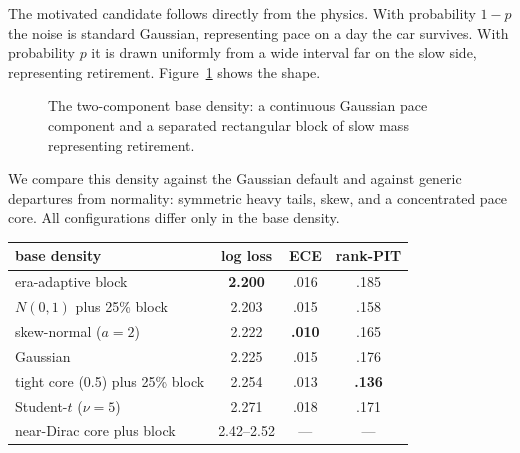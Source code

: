 \documentclass[11pt]{article}
\begin{document}
The motivated candidate follows directly from the physics. With
probability $1-p$ the noise is standard Gaussian, representing pace on a
day the car survives. With probability $p$ it is drawn uniformly from a
wide interval far on the slow side, representing retirement.
Figure~\ref{fig:slab} shows the shape.

\begin{figure}[h]
\centering
{}
\caption{The two-component base density: a continuous Gaussian pace
component and a separated rectangular block of slow mass representing
retirement.}
\label{fig:slab}
\end{figure}

We compare this density against the Gaussian default and against generic
departures from normality: symmetric heavy tails, skew, and a
concentrated pace core. All configurations differ only in the base
density.

\begin{center}
\begin{tabular}{lccc}
\toprule
base density & log loss & ECE & rank-PIT \\
\midrule
era-adaptive block & \textbf{2.200} & .016 & .185 \\
$N(0,1)$ plus 25\% block & 2.203 & .015 & .158 \\
skew-normal ($a{=}2$) & 2.222 & \textbf{.010} & .165 \\
Gaussian & 2.225 & .015 & .176 \\
tight core (0.5) plus 25\% block & 2.254 & .013 & \textbf{.136} \\
Student-$t$ ($\nu{=}5$) & 2.271 & .018 & .171 \\
near-Dirac core plus block & 2.42--2.52 & --- & --- \\
\bottomrule
\end{tabular}
\end{center}
\end{document}
